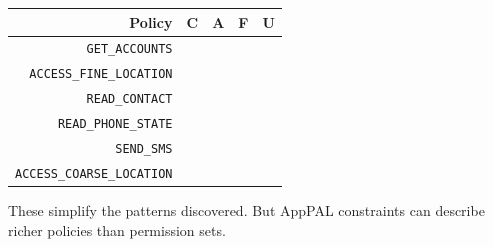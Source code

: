 \documentclass[]{soups-poster}
\newcommand{\xmark}{{\footnotesize\ding{55}}}
\newcommand{\citep}[1]{\cite{#1}}
\renewcommand{\rothead}[2][30]{\rlap{\makebox[4mm][l]{\rotatebox{#1}{\makecell[c]{\footnotesize \textsf{#2}}}}}}%
\begin{document}
\newcommand{\tabtitle}[1]{\textbf{\footnotesize #1}}
\begin{center}
  \begin{tabular}{ r l l l l }
    \toprule
    \tabtitle{Policy} & \tabtitle{C}             & \tabtitle{A} & \tabtitle{F} & \tabtitle{U} \\
    \midrule
    \lstinline{GET_ACCOUNTS}           & \xmark{}               & \xmark{}           & \xmark{}              & \xmark{}              \\
    \lstinline{ACCESS_FINE_LOCATION}   & \xmark{}               & \xmark{}           & \xmark{}              &                       \\
    \lstinline{READ_CONTACT}           & \xmark{}               & \xmark{}           & \xmark{}              &                       \\
    \lstinline{READ_PHONE_STATE}       & \xmark{}               & \xmark{}           &                       &                       \\
    \lstinline{SEND_SMS}               & \xmark{}               & \xmark{}           &                       &                       \\
    \lstinline{ACCESS_COARSE_LOCATION} & \xmark{}               &                    &                       &                       \\
    \bottomrule
  \end{tabular}
\end{center}

These simplify the patterns discovered. %
But AppPAL constraints
can describe richer policies than permission sets.

%
%
%
\end{document}
